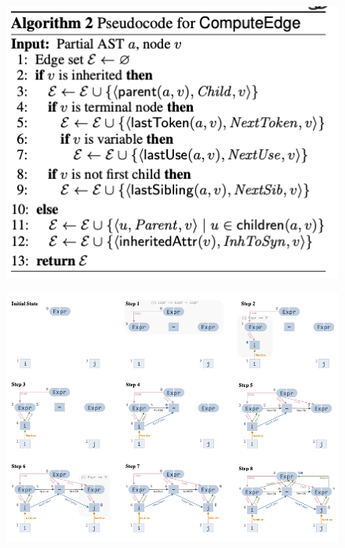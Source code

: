 \documentclass{article}
\begin{document}
\begin{figure}[ht]
\vskip 0.2in
\begin{center}
\centerline{\includegraphics[width=\columnwidth]{Images/Synthesis2-1.png}}
\label{icml-historical}
\end{center}
\vskip -0.2in
\end{figure}
\begin{figure}[ht]
\vskip 0.2in
\begin{center}
\centerline{\includegraphics[width=\columnwidth]{Images/Synthesis2-2.png}}
\label{icml-historical}
\end{center}
\vskip -0.2in
\end{figure}
\end{document}
